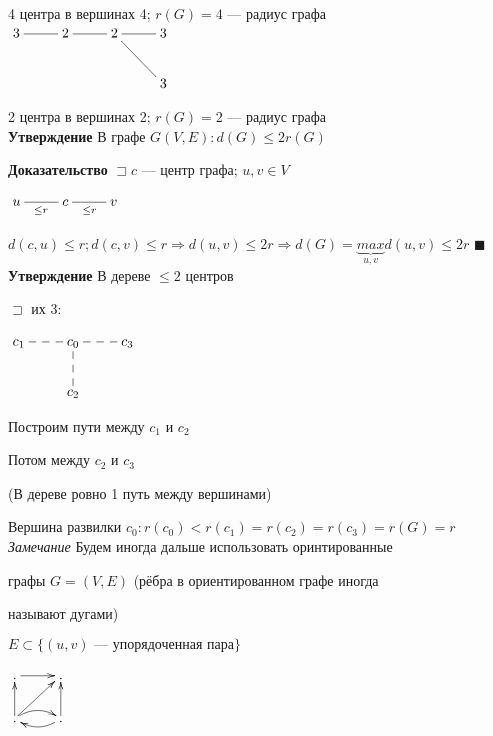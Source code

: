 \documentclass[a4paper, 12pt] {article}
\begin{document}
4 центра в вершинах 4; $ r(G) =4 $ --- радиус графа\\

$ \begin{matrix}
	\xymatrix{
		3 \ar@{-}[r]  & 2 \ar@{-}[r]  & 2  \ar@{-}[rd] \ar@{-}[r] & 3 \\
		 & & & 3 \\
	}
\end{matrix} $ 

2 центра в вершинах 2; $ r(G) =2 $ --- радиус графа\\

\textbf{Утверждение } В графе $ G(V, E): d(G) \le 2r(G) $

\textbf{Доказательство} $  \sqsupset  c $ --- центр графа; $ u, v \in V $

$ \begin{matrix}
	\xymatrix{
		u \ar@{-}[r]_{\le r}  & c \ar@{-}[r]_{\le r}  & v  \\
	}
\end{matrix} $ 

$ d(c,u) \le r;  d(c,v) \le r \Rightarrow d(u,v) \le 2r \Rightarrow d(G) = \underbrace{max}_{u, v} d(u,v) \le 2r $ $ \blacksquare $\\

\textbf{Утверждение } В дереве $ \le 2 $ центров

$ \sqsupset  $ их 3:

$ \begin{matrix}
	\xymatrix{
		c_{1}  \ar@{--}[r] & c_{0} \ar@{--}[r] \ar@{--}[d] & c_{3}  \\
		& c_{2}  \\
	}
\end{matrix} $ 

Построим пути между $ c_{1} $ и $ c_{2} $

Потом между $ c_{2} $ и $ c_{3} $

(В дереве ровно 1 путь между вершинами)

Вершина развилки $ c_{0}: r(c_{0}) < r(c_{1})=r(c_{2})=r(c_{3})=r(G)=r $\\

\textit{Замечание} Будем иногда дальше использовать оринтированные 

графы $ G=(V, E) $ (рёбра в ориентированном графе иногда 

называют дугами)

$ E \subset \{ (u, v) \text{ --- упорядоченная пара} \} $

$ \begin{matrix}
	\xymatrix{
		. \ar@{->}[r] \ar@{<-}[d] & .  \ar@{<-}[d]  \\
		. \ar@/^/[r] \ar@{->}[ru]  & . \ar@/^/[l]  \\
	}
\end{matrix} $\\
\end{document}
